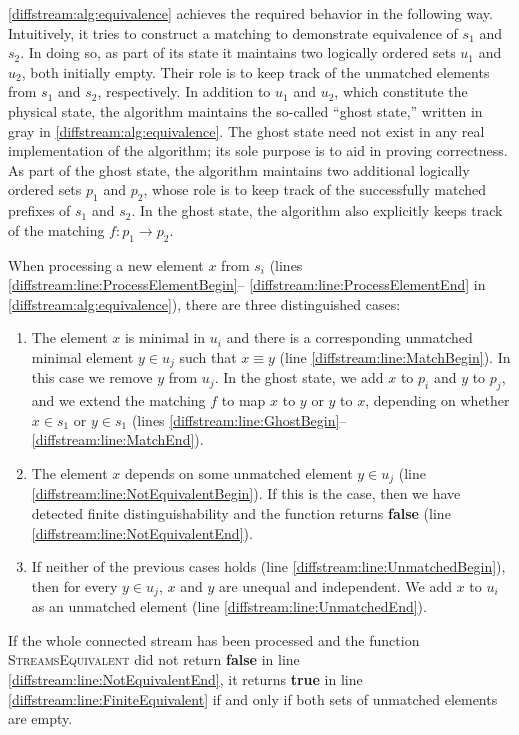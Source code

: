 \cref{diffstream:alg:equivalence} achieves the required behavior in the following
way. Intuitively,
it tries to construct a matching to demonstrate equivalence of
$s_1$ and $s_2$. In doing so, as part of its state
it maintains two logically ordered sets
$u_1$ and $u_2$,
both initially empty. Their role is to keep track of the unmatched elements from
$s_1$ and $s_2$, respectively.
In addition to $u_1$ and $u_2$, which constitute the physical state, the
algorithm maintains the so-called ``ghost state,'' written in gray in
\cref{diffstream:alg:equivalence}. The ghost state need not exist in any real
implementation of the algorithm; its sole purpose is to aid in proving
correctness. As part of the ghost state, the algorithm maintains two additional
logically ordered sets $p_1$ and $p_2$, whose role is to keep track of the
successfully matched prefixes of $s_1$ and $s_2$. In the ghost state, the
algorithm also explicitly
keeps track of the matching $f\colon p_1\to p_2$.

When processing a new element $x$ from $s_i$
(lines \ref{diffstream:line:ProcessElementBegin}--%
\ref{diffstream:line:ProcessElementEnd} in \cref{diffstream:alg:equivalence}), there are three
distinguished cases:
\begin{enumerate}
  \item The element $x$ is minimal in $u_i$ and there is a corresponding
    unmatched minimal element $y\in u_j$ such that $x \equiv y$ (line
    \ref{diffstream:line:MatchBegin}). In this case
    we remove $y$ from $u_j$. In the ghost state, we add $x$ to $p_i$ and $y$
    to $p_j$, and we extend the matching $f$ to map $x$ to $y$
    or $y$ to $x$, depending on whether $x\in s_1$ or $y\in s_1$ (lines \ref{diffstream:line:GhostBegin}--\ref{diffstream:line:MatchEnd}).
  \item The element $x$ depends on some unmatched element $y\in u_j$ (line
    \ref{diffstream:line:NotEquivalentBegin}).
    If this is the case, then we have detected finite distinguishability
    and the function returns \textbf{false} (line
    \ref{diffstream:line:NotEquivalentEnd}).
  \item If neither of the previous cases holds (line \ref{diffstream:line:UnmatchedBegin}),
    then for every $y\in u_j$, $x$ and $y$ are unequal and independent.
    We add $x$ to $u_i$ as an
    unmatched element (line \ref{diffstream:line:UnmatchedEnd}).
\end{enumerate}

If the whole connected stream has been processed and the function \textsc{StreamsEquivalent} did not return \textbf{false} in line \ref{diffstream:line:NotEquivalentEnd}, it returns \textbf{true} in line \ref{diffstream:line:FiniteEquivalent} if and only if both sets of
unmatched elements are empty.

